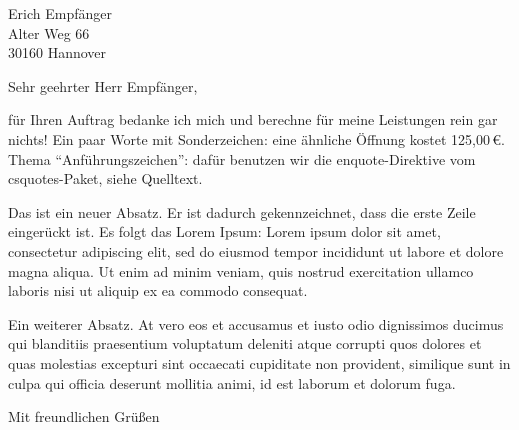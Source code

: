 \documentclass[paper=a4,fontsize=12pt]{scrartcl}
\begin{document}
\begin{letter}{
Erich Empfänger\\
Alter Weg 66 \\
30160 Hannover
}

\opening{Sehr geehrter Herr Empfänger,}


für Ihren Auftrag bedanke ich mich und berechne für meine Leistungen rein gar
nichts! Ein paar Worte mit Sonderzeichen: eine ähnliche Öffnung kostet
125,00\,€. Thema \enquote{Anführungszeichen}: dafür benutzen wir die
enquote-Direktive vom csquotes-Paket, siehe Quelltext.

\setlength{\parindent}{20pt}

Das ist ein neuer Absatz. Er ist dadurch gekennzeichnet, dass die erste Zeile
eingerückt ist. Es folgt das Lorem Ipsum: Lorem ipsum dolor sit amet,
consectetur adipiscing elit, sed do eiusmod tempor incididunt ut labore et
dolore magna aliqua. Ut enim ad minim veniam, quis nostrud exercitation ullamco
laboris nisi ut aliquip ex ea commodo consequat.

Ein weiterer Absatz. At vero eos et accusamus et iusto odio dignissimos ducimus
qui blanditiis praesentium voluptatum deleniti atque corrupti quos dolores et
quas molestias excepturi sint occaecati cupiditate non provident, similique sunt
in culpa qui officia deserunt mollitia animi, id est laborum et dolorum fuga.

\closing{Mit freundlichen Grüßen}
\end{letter}
\end{document}
